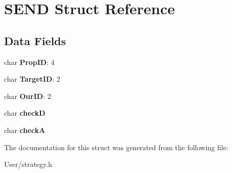\hypertarget{struct_s_e_n_d}{}\section{S\+E\+N\+D Struct Reference}
\label{struct_s_e_n_d}
\subsection*{Data Fields}
\begin{DoxyCompactItemize}
\item 
\hypertarget{struct_s_e_n_d_acae832b84d5e4a55277e59da281aefb5}{}char {\bfseries Prop\+I\+D}\+: 4\label{struct_s_e_n_d_acae832b84d5e4a55277e59da281aefb5}

\item 
\hypertarget{struct_s_e_n_d_a8f94ec8b6b2d87c5886f1fdd16163bef}{}char {\bfseries Target\+I\+D}\+: 2\label{struct_s_e_n_d_a8f94ec8b6b2d87c5886f1fdd16163bef}

\item 
\hypertarget{struct_s_e_n_d_a5d227240942c1747a84dd69625635962}{}char {\bfseries Our\+I\+D}\+: 2\label{struct_s_e_n_d_a5d227240942c1747a84dd69625635962}

\item 
\hypertarget{struct_s_e_n_d_aefc52e351b70af82471693e0c1a1203b}{}char {\bfseries check\+D}\label{struct_s_e_n_d_aefc52e351b70af82471693e0c1a1203b}

\item 
\hypertarget{struct_s_e_n_d_ab43e6536e5bea9bec39314e31ac6d81a}{}char {\bfseries check\+A}\label{struct_s_e_n_d_ab43e6536e5bea9bec39314e31ac6d81a}

\end{DoxyCompactItemize}


The documentation for this struct was generated from the following file\+:\begin{DoxyCompactItemize}
\item 
User/strategy.\+h\end{DoxyCompactItemize}
